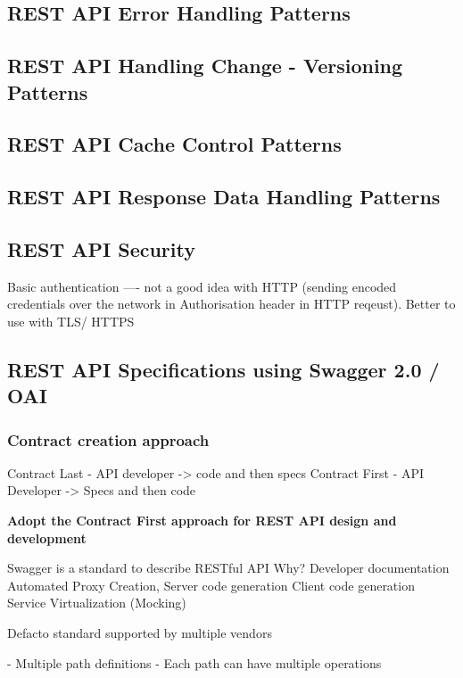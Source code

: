 \documentclass[a4paper, 11pt]{book}
\begin{document}
    \subsection{REST API Error Handling Patterns}

    \subsection{REST API Handling Change - Versioning Patterns}

    \subsection{REST API Cache Control Patterns}

    \subsection{REST API Response Data Handling Patterns}

    \subsection{REST API Security}

    Basic authentication ---- not a good idea with HTTP (sending encoded credentials over the network in Authorisation header in HTTP reqeust). Better to use with TLS/ HTTPS

    \subsection{REST API Specifications using Swagger 2.0 / OAI}

    \subsubsection{Contract creation approach}
    Contract Last - API developer -> code and then specs
    Contract First - API Developer -> Specs and then code

    \textbf{Adopt the Contract First approach for REST API design and development}

    Swagger is a standard to describe RESTful API
    Why?
    Developer documentation
    Automated Proxy Creation, Server code generation
    Client code generation
    Service Virtualization (Mocking)

    Defacto standard supported by multiple vendors

    - Multiple path definitions
    - Each path can have multiple operations
\end{document}
